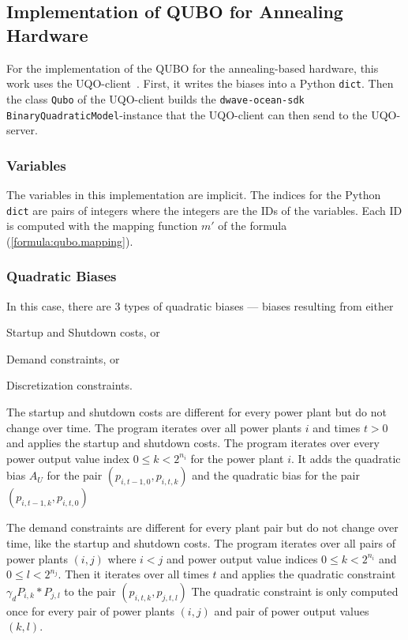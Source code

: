 \subsection{Implementation of QUBO for Annealing Hardware}
\label{implementation:annealing.qubo}

For the implementation of the QUBO for the annealing-based hardware, this work uses the UQO-client~\cite{UQOPyPI, UQOGitHub}.
First, it writes the biases into a Python \texttt{dict}.
Then the class \texttt{Qubo} of the UQO-client builds the \texttt{dwave-ocean-sdk} \texttt{BinaryQuadraticModel}-instance that the UQO-client can then send to the UQO-server.

\subsubsection{Variables}
\label{implementation:annealing.qubo.variables}

The variables in this implementation are implicit.
The indices for the Python \texttt{dict} are pairs of integers where the integers are the IDs of the variables.
Each ID is computed with the mapping function $m'$ of the formula (\ref{formula:qubo.mapping}).

\subsubsection{Quadratic Biases}
\label{implementation:annealing.qubo.quadratic}

In this case, there are $3$ types of quadratic biases --- biases resulting from either
\begin{enumerate*}[label=(\roman*)]
  \item Startup and Shutdown costs, or
  \item Demand constraints, or
  \item Discretization constraints.
\end{enumerate*}

The startup and shutdown costs are different for every power plant but do not change over time.
The program iterates over all power plants $i$ and times $t > 0$ and applies the startup and shutdown costs.
The program iterates over every power output value index $0 \leq k < 2^{n_i}$ for the power plant $i$.
It adds the quadratic bias $A_U$ for the pair $(p_{i, t-1, 0}, p_{i, t, k})$ and the quadratic bias for the pair $(p_{i, t-1, k}, p_{i, t, 0})$

The demand constraints are different for every plant pair but do not change over time, like the startup and shutdown costs.
The program iterates over all pairs of power plants $(i, j)$ where $i < j$ and power output value indices $0 \leq k < 2^{n_i}$ and $0 \leq l < 2^{n_j}$.
Then it iterates over all times $t$ and applies the quadratic constraint $\gamma_d P_{i, k} * P_{j, l}$ to the pair $(p_{i, t, k}, p_{j, t, l})$
The quadratic constraint is only computed once for every pair of power plants $(i, j)$ and pair of power output values $(k, l)$.

